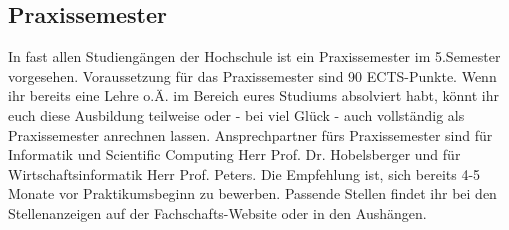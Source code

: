 \subsection{Praxissemester}
In fast allen Studiengängen der Hochschule ist ein Praxissemester im 
5.Semester vorgesehen. Voraussetzung für das Praxissemester sind 
90 ECTS-Punkte. Wenn ihr bereits eine Lehre o.Ä. im Bereich eures 
Studiums absolviert habt, könnt ihr euch diese Ausbildung teilweise oder - bei viel Glück - auch vollständig als
Praxissemester anrechnen lassen. Ansprechpartner fürs Praxissemester 
sind für Informatik und Scientific Computing Herr Prof. Dr. Hobelsberger und für 
Wirtschaftsinformatik Herr Prof. Peters.\doublebreak
Die Empfehlung ist, sich bereits 4-5 Monate vor Praktikumsbeginn zu 
bewerben. Passende Stellen findet ihr bei den Stellenanzeigen auf der 
Fachschafts-Website oder in den Aushängen.